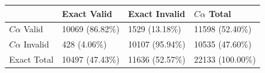 \begin{tabular}{llll}
\toprule
 & Exact Valid & Exact Invalid & $C\alpha$ Total \\
\midrule
$C\alpha$ Valid & 10069 (86.82\%) & 1529 (13.18\%) & 11598 (52.40\%) \\
$C\alpha$ Invalid & 428 (4.06\%) & 10107 (95.94\%) & 10535 (47.60\%) \\
Exact Total & 10497 (47.43\%) & 11636 (52.57\%) & 22133 (100.00\%) \\
\bottomrule
\end{tabular}

